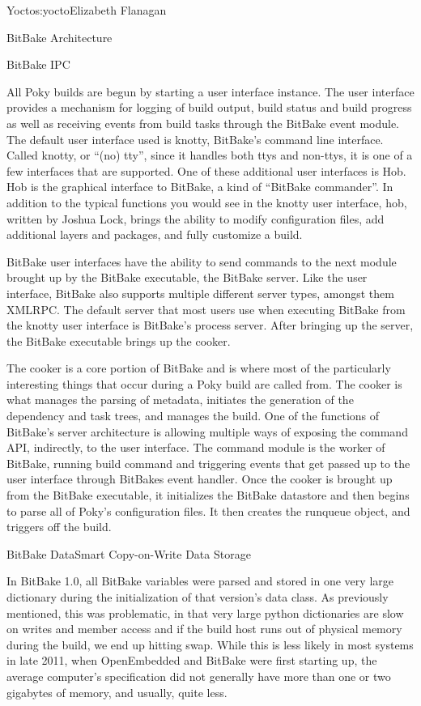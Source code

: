 \begin{aosachapter}{Yocto}{s:yocto}{Elizabeth Flanagan}
\begin{aosasect1}{BitBake Architecture}
\begin{aosasect2}{BitBake IPC}

All Poky builds are begun by starting a user interface instance. The
user interface provides a mechanism for logging of build output, build
status and build progress as well as receiving events from build tasks
through the BitBake event module.  The default user interface used is
knotty, BitBake's command line interface. Called knotty, or ``(no)
tty'', since it handles both ttys and non-ttys, it is one of a few
interfaces that are supported.  One of these additional user
interfaces is Hob. Hob is the graphical interface to BitBake, a kind
of ``BitBake commander''. In addition to the typical functions you
would see in the knotty user interface, hob, written by Joshua Lock,
brings the ability to modify configuration files, add additional
layers and packages, and fully customize a build.

BitBake user interfaces have the ability to send commands to the next
module brought up by the BitBake executable, the BitBake server. Like
the user interface, BitBake also supports multiple different server
types, amongst them XMLRPC. The default server that most users use
when executing BitBake from the knotty user interface is BitBake's
process server. After bringing up the server, the BitBake executable
brings up the cooker.

The cooker is a core portion of BitBake and is where most of the
particularly interesting things that occur during a Poky build are
called from. The cooker is what manages the parsing of metadata,
initiates the generation of the dependency and task trees, and manages
the build. One of the functions of BitBake's server architecture is
allowing multiple ways of exposing the command API, indirectly, to the
user interface. The command module is the worker of BitBake, running
build command and triggering events that get passed up to the user
interface through BitBakes event handler.  Once the cooker is brought
up from the BitBake executable, it initializes the BitBake datastore
and then begins to parse all of Poky's configuration files. It then
creates the runqueue object, and triggers off the build.

\end{aosasect2}

\begin{aosasect2}{BitBake DataSmart Copy-on-Write Data Storage}

In BitBake 1.0, all BitBake variables were parsed and stored in one
very large dictionary during the initialization of that version's data
class. As previously mentioned, this was problematic, in that very
large python dictionaries are slow on writes and member access and if
the build host runs out of physical memory during the build, we end up
hitting swap. While this is less likely in most systems in late 2011,
when OpenEmbedded and BitBake were first starting up, the average
computer's specification did not generally have more than one or two
gigabytes of memory, and usually, quite less.


\end{aosasect2}
\end{aosasect1}
\end{aosachapter}
